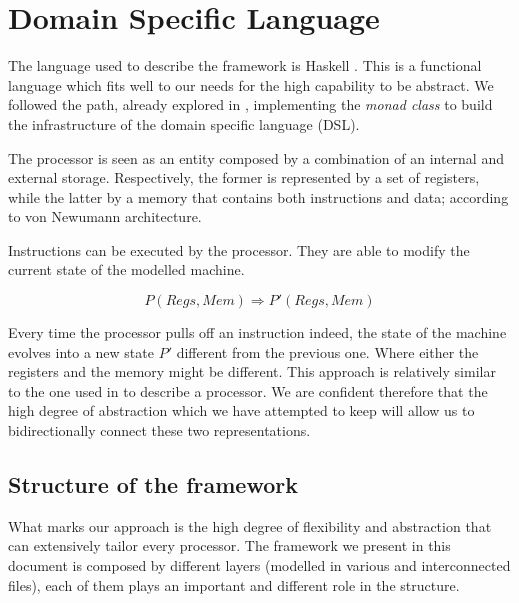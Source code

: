 \documentclass[conference]{IEEEtran}
\begin{document}

\section{Domain Specific Language}
\label{sec:dsl}
The language used to describe the framework is Haskell \cite{haskell}. This is a 
functional language which fits well to our needs for the high capability to be abstract.
We followed the path, already explored in \cite{armv7}, implementing the \textit{monad class}
to build the infrastructure of the domain specific language (DSL).

The processor is seen as an entity composed by a combination of an internal and
external storage. Respectively, the former is represented by a set of registers,
while the latter by a memory that contains both instructions and data; according to von
Newumann architecture. 

Instructions can be executed by the processor. They are able to modify the current 
state of the modelled machine.

$$P(Regs, Mem) \Rightarrow P'(Regs, Mem)$$

\noindent Every time the processor pulls off an instruction indeed, the state of the machine
evolves into a new state $P'$ different from the previous one. Where either the registers and
the memory might be different. This approach is relatively similar to the one used in
\cite{isaFunc} to describe a processor. We are confident therefore that the high degree of
abstraction which we have attempted to keep will allow us to bidirectionally connect these
two representations.

\subsection{Structure of the framework}
\label{sec:struct}
What marks our approach is the high degree of flexibility and abstraction that can
extensively tailor every processor. The framework we present in this document is composed
by different layers (modelled in various and interconnected files), each of them plays 
an important and different role in the structure.
\end{document}
